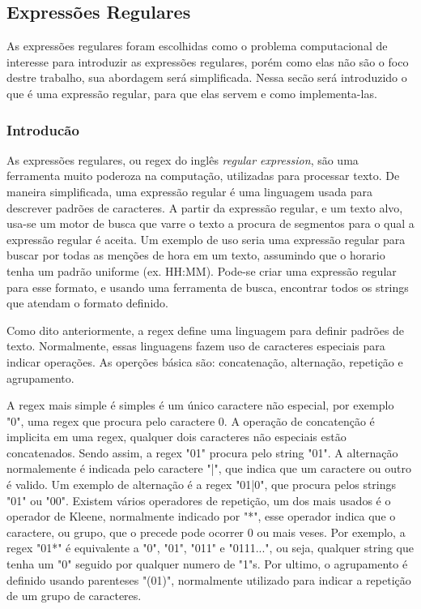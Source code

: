 \subsection{Expressões Regulares}
As expressões regulares foram escolhidas como o problema computacional de interesse para introduzir as expressões regulares, porém como elas não são o foco destre trabalho, sua abordagem será simplificada.
Nessa secão será introduzido o que é uma expressão regular, para que elas servem e como implementa-las.

\subsubsection{Introducão}
As expressões regulares, ou regex do inglês \emph{regular expression}, são uma ferramenta muito poderoza na computação, utilizadas para processar texto.
De maneira simplificada, uma expressão regular é uma linguagem usada para descrever padrões de caracteres.
A partir da expressão regular, e um texto alvo, usa-se um motor de busca que varre o texto a procura de segmentos para o qual a expressão regular é aceita.
Um exemplo de uso seria uma expressão regular para buscar por todas as menções de hora em um texto, assumindo que o horario tenha um padrão uniforme (ex. HH:MM).
Pode-se criar uma expressão regular para esse formato, e usando uma ferramenta de busca, encontrar todos os strings que atendam o formato definido.

Como dito anteriormente, a regex define uma linguagem para definir padrões de texto.
Normalmente, essas linguagens fazem uso de caracteres especiais para indicar operações.
As operções básica são: concatenação, alternação, repetição e agrupamento.

A regex mais simple é simples é um único caractere não especial, por exemplo "0", uma regex que procura pelo caractere 0.
A operação de concatenção é implicita em uma regex, qualquer dois caracteres não especiais estão concatenados.
Sendo assim, a regex "01" procura pelo string "01".
A alternação normalemente é indicada pelo caractere "|", que indica que um caractere ou outro é valido.
Um exemplo de alternação é a regex "01|0", que procura pelos strings "01" ou "00".
Existem vários operadores de repetição, um dos mais usados é o operador de Kleene, normalmente indicado por "*", esse operador indica que o caractere, ou grupo, que o precede pode ocorrer 0 ou mais veses.
Por exemplo, a regex "01*" é equivalente a "0", "01", "011" e "0111...", ou seja, qualquer string que tenha um "0" seguido por qualquer numero de "1"s.
Por ultimo, o agrupamento é definido usando parenteses "(01)", normalmente utilizado para indicar a repetição de um grupo de caracteres.

